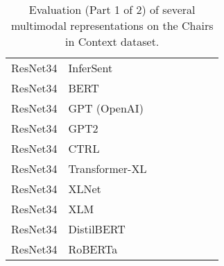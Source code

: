 \documentclass[11pt,a4paper]{article}
\begin{document}
\begin{table*}[t!]
\begin{tabular}{llcccccc}
ResNet34 & InferSent & & & & & & \\
ResNet34 & BERT & & & & & & \\
ResNet34 & GPT (OpenAI) & & & & & & \\
ResNet34 & GPT2 & & & & & & \\
ResNet34 & CTRL & & & & & & \\
ResNet34 & Transformer-XL & & & & & & \\
ResNet34 & XLNet & & & & & & \\
ResNet34 & XLM & & & & & & \\
ResNet34 & DistilBERT & & & & & & \\
ResNet34 & RoBERTa & & & & & & \\
\hline
\end{tabular}
\caption{\label{table:colors} Evaluation (Part 1 of 2) of several multimodal representations on the Chairs in Context dataset.}
\end{table*}
\end{document}
